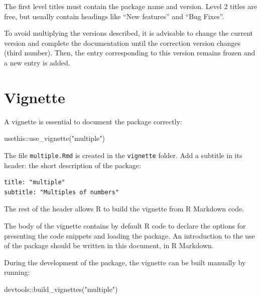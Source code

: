 \documentclass[
  12pt,
  american,
  a4paper,
  extrafontsizes,onecolumn,openright
  ]{memoir}
\newenvironment{Shaded}{\begin{snugshade}}{\end{snugshade}}
\newcommand{\FunctionTok}[1]{\textcolor[rgb]{0.00,0.00,0.00}{#1}}
\newcommand{\NormalTok}[1]{#1}
\newcommand{\SpecialCharTok}[1]{\textcolor[rgb]{0.00,0.00,0.00}{#1}}
\newcommand{\StringTok}[1]{\textcolor[rgb]{0.31,0.60,0.02}{#1}}
\begin{document}
The first level titles must contain the package name and version.
Level 2 titles are free, but usually contain headings like \enquote{New features} and \enquote{Bug Fixes}.

To avoid multiplying the versions described, it is advisable to change the current version and complete the documentation until the correction version changes (third number).
Then, the entry corresponding to this version remains frozen and a new entry is added.

\hypertarget{vignette}{%
\section{Vignette}\label{vignette}}

A vignette is essential to document the package correctly:

\scriptsize

\begin{Shaded}
\begin{Highlighting}[]
\NormalTok{usethis}\SpecialCharTok{::}\FunctionTok{use\_vignette}\NormalTok{(}\StringTok{"multiple"}\NormalTok{)}
\end{Highlighting}
\end{Shaded}

\normalsize

The file \texttt{multiple.Rmd} is created in the \texttt{vignette} folder.
Add a subtitle in its header: the short description of the package:

\begin{verbatim}
title: "multiple"
subtitle: "Multiples of numbers"
\end{verbatim}

The rest of the header allows R to build the vignette from R Markdown code.

The body of the vignette contains by default R code to declare the options for presenting the code snippets and loading the package.
An introduction to the use of the package should be written in this document, in R Markdown.

During the development of the package, the vignette can be built manually by running:

\scriptsize

\begin{Shaded}
\begin{Highlighting}[]
\NormalTok{devtools}\SpecialCharTok{::}\FunctionTok{build\_vignettes}\NormalTok{(}\StringTok{"multiple"}\NormalTok{)}
\end{Highlighting}
\end{Shaded}
\end{document}
